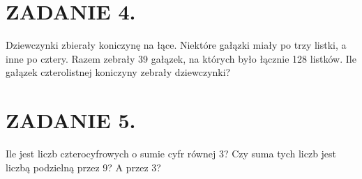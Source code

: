 \documentclass[10pt]{article}
\begin{document}
\section*{ZADANIE 4.}
Dziewczynki zbierały koniczynę na łące. Niektóre gałązki miały po trzy listki, a inne po cztery. Razem zebrały 39 gałązek, na których było łącznie 128 listków. Ile gałązek czterolistnej koniczyny zebrały dziewczynki?

\section*{ZADANIE 5.}
Ile jest liczb czterocyfrowych o sumie cyfr równej 3? Czy suma tych liczb jest liczbą podzielną przez 9? A przez 3?
\end{document}
